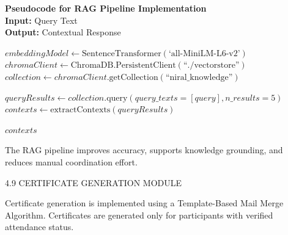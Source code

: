 \noindent\textbf{Pseudocode for RAG Pipeline Implementation} 
\vspace{.2em} \\
\noindent\textbf{Input:} Query Text\\
\noindent\textbf{Output:} Contextual Response
\begin{algorithmic}[1]
    \State $embeddingModel \gets \text{SentenceTransformer}(\text{`all-MiniLM-L6-v2'})$
    \State $chromaClient \gets \text{ChromaDB.PersistentClient}(\text{``./vectorstore''})$
    \State $collection \gets chromaClient.\text{getCollection}(\text{``niral\_knowledge''})$
    
    \State $queryResults \gets collection.\text{query}(query\_texts=[query], n\_results=5)$
    \State $contexts \gets \text{extractContexts}(queryResults)$
    
    \State \Return $contexts$
\EndFunction
\end{algorithmic}

The RAG pipeline improves accuracy, supports knowledge grounding, and reduces manual coordination effort.

4.9 CERTIFICATE GENERATION MODULE

Certificate generation is implemented using a Template-Based Mail Merge Algorithm. Certificates are generated only for participants with verified attendance status.

